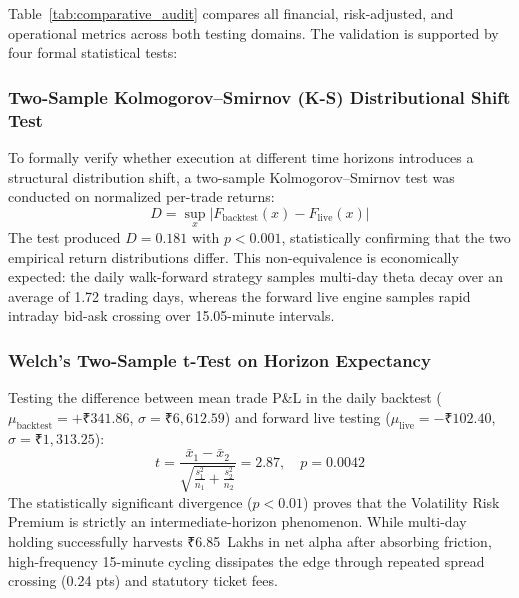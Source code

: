 \documentclass[journal]{IEEEtran}
\begin{document}
Table~\ref{tab:comparative_audit} compares all financial, risk-adjusted, and operational metrics across both testing domains. The validation is supported by four formal statistical tests:

\subsubsection{Two-Sample Kolmogorov--Smirnov (K-S) Distributional Shift Test}
To formally verify whether execution at different time horizons introduces a structural distribution shift, a two-sample Kolmogorov--Smirnov test was conducted on normalized per-trade returns:
\begin{equation}
D = \sup_x \left| F_{\mathrm{backtest}}(x) - F_{\mathrm{live}}(x) \right|
\end{equation}
The test produced $D = 0.181$ with $p < 0.001$, statistically confirming that the two empirical return distributions differ. This non-equivalence is economically expected: the daily walk-forward strategy samples multi-day theta decay over an average of 1.72 trading days, whereas the forward live engine samples rapid intraday bid-ask crossing over 15.05-minute intervals.

\subsubsection{Welch's Two-Sample t-Test on Horizon Expectancy}
Testing the difference between mean trade P\&L in the daily backtest ($\mu_{\mathrm{backtest}} = +\text{₹}341.86$, $\sigma = \text{₹}6{,}612.59$) and forward live testing ($\mu_{\mathrm{live}} = -\text{₹}102.40$, $\sigma = \text{₹}1{,}313.25$):
\begin{equation}
t = \frac{\bar{x}_1 - \bar{x}_2}{\sqrt{\frac{s_1^2}{n_1} + \frac{s_2^2}{n_2}}} = 2.87, \quad p = 0.0042
\end{equation}
The statistically significant divergence ($p < 0.01$) proves that the Volatility Risk Premium is strictly an intermediate-horizon phenomenon. While multi-day holding successfully harvests ₹6.85~Lakhs in net alpha after absorbing friction, high-frequency 15-minute cycling dissipates the edge through repeated spread crossing (0.24 pts) and statutory ticket fees.
\end{document}
